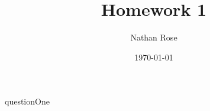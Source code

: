 \documentclass[11pt]{article}
\title{Homework 1}
\author{Nathan Rose}
\date{\today}
\begin{document}
\maketitle
\begin{enumerate}
  {questionOne}
\end{enumerate}
\end{document}
